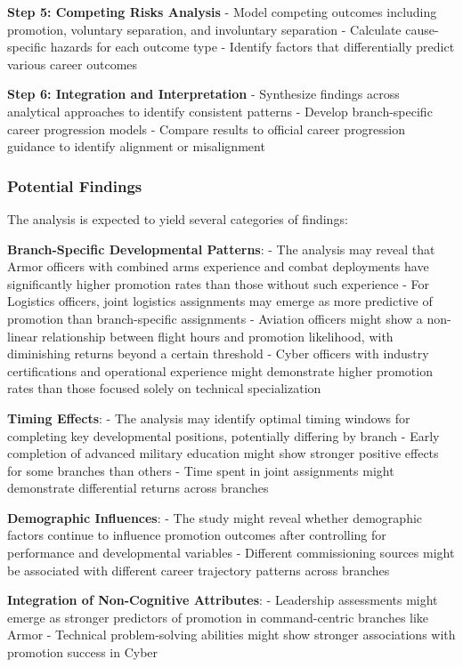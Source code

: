 \documentclass[
  letterpaper,
  DIV=11,
  numbers=noendperiod]{scrartcl}
\begin{document}
\textbf{Step 5: Competing Risks Analysis} - Model competing outcomes
including promotion, voluntary separation, and involuntary separation -
Calculate cause-specific hazards for each outcome type - Identify
factors that differentially predict various career outcomes

\textbf{Step 6: Integration and Interpretation} - Synthesize findings
across analytical approaches to identify consistent patterns - Develop
branch-specific career progression models - Compare results to official
career progression guidance to identify alignment or misalignment

\subsubsection{Potential Findings}\label{potential-findings}

The analysis is expected to yield several categories of findings:

\textbf{Branch-Specific Developmental Patterns}: - The analysis may
reveal that Armor officers with combined arms experience and combat
deployments have significantly higher promotion rates than those without
such experience - For Logistics officers, joint logistics assignments
may emerge as more predictive of promotion than branch-specific
assignments - Aviation officers might show a non-linear relationship
between flight hours and promotion likelihood, with diminishing returns
beyond a certain threshold - Cyber officers with industry certifications
and operational experience might demonstrate higher promotion rates than
those focused solely on technical specialization

\textbf{Timing Effects}: - The analysis may identify optimal timing
windows for completing key developmental positions, potentially
differing by branch - Early completion of advanced military education
might show stronger positive effects for some branches than others -
Time spent in joint assignments might demonstrate differential returns
across branches

\textbf{Demographic Influences}: - The study might reveal whether
demographic factors continue to influence promotion outcomes after
controlling for performance and developmental variables - Different
commissioning sources might be associated with different career
trajectory patterns across branches

\textbf{Integration of Non-Cognitive Attributes}: - Leadership
assessments might emerge as stronger predictors of promotion in
command-centric branches like Armor - Technical problem-solving
abilities might show stronger associations with promotion success in
Cyber
\end{document}
